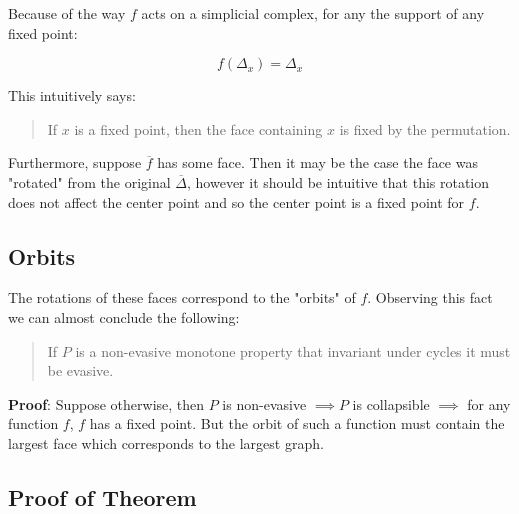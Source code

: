\documentclass[letterpaper,12pt]{article}
\newcommand{\ol}{\overline}
\begin{document}
Because of the way $f$ acts on a simplicial complex, for any the support of any fixed point:

$$f(\Delta_{x}) = \Delta_x$$

This intuitively says:

\begin{quote}
    If $x$ is a fixed point, then the face containing $x$ is fixed by the permutation.
\end{quote}

Furthermore, suppose $\ol{f}$ has some face. Then it may be the case the face was "rotated" from the original $\ol{\Delta}$, however it should be intuitive that this rotation does not affect the center point and so the center point is a fixed point for $f$.

\subsection{Orbits}

The rotations of these faces correspond to the "orbits" of $f$. Observing this fact we can almost conclude the following:

\begin{quote}
    If $P$ is a non-evasive monotone property that invariant under cycles it must be evasive.
\end{quote}

\textbf{Proof}: Suppose otherwise, then $P$ is non-evasive $\implies P$ is collapsible $\implies$ for any function $f$, $f$ has a fixed point. But the orbit of such a function must contain the largest face which corresponds to the largest graph.

\subsection{Proof of Theorem}
\end{document}
